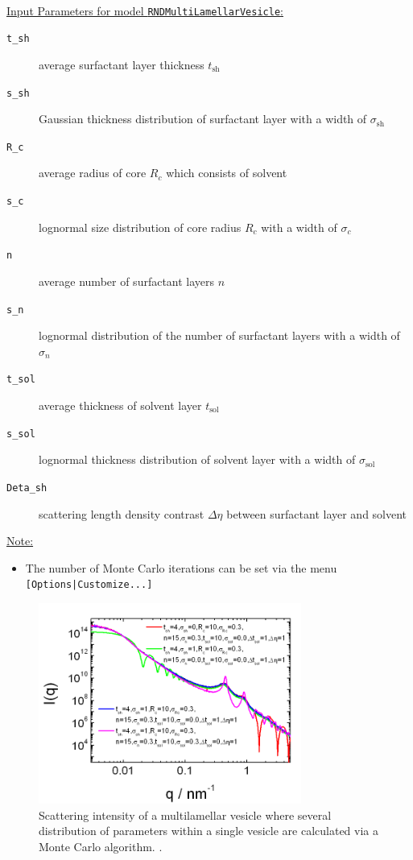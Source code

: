 \hspace{1mm}\\
\underline{Input Parameters for model
\texttt{RNDMultiLamellarVesicle}:}
\begin{description}
\item[\texttt{t\_sh}] average surfactant layer thickness $t_\text{sh}$
\item[\texttt{s\_sh}] Gaussian thickness distribution of surfactant layer with a width of $\sigma_\text{sh}$
\item[\texttt{R\_c}] average radius of core $R_c$ which consists of solvent
\item[\texttt{s\_c}] lognormal size distribution of core radius $R_c$ with a width of $\sigma_c$
\item[\texttt{n}] average number of surfactant layers $n$
\item[\texttt{s\_n}] lognormal distribution of the number of surfactant layers with a width of $\sigma_n$
\item[\texttt{t\_sol}] average thickness of solvent layer $t_\text{sol}$
\item[\texttt{s\_sol}] lognormal thickness distribution of solvent layer with a width of $\sigma_\text{sol}$
\item[\texttt{Deta\_sh}] scattering length density contrast $\Delta\eta$ between surfactant layer and solvent
\end{description}

\noindent\underline{Note:}
\begin{itemize}
\item[~] The number of Monte Carlo iterations can be set via the menu \texttt{[Options|Customize...]}
\end{itemize}

\begin{figure}[htb]
\begin{center}
\includegraphics[width=0.768\textwidth,height=0.588\textwidth]{../images/form_factor/spheres/random_multilamellar_vesicle_Iq.png}
\end{center}
\caption{Scattering intensity of a multilamellar vesicle where several distribution of parameters
within a single vesicle are calculated via a Monte Carlo algorithm. .}
\label{fig:I_rndMLV}
\end{figure}

